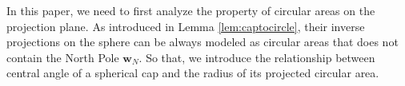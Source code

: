 \documentclass[final]{IEEEtran}
\newtheorem{corollary}{Corollary}
\begin{document}
\indent In this paper, we need to first analyze the property of circular areas on the projection plane. As introduced in Lemma \ref{lem:captocircle}, their inverse projections on the sphere can be always modeled as circular areas that does not contain the North Pole $\textbf{w}_N$. So that, we introduce the relationship between central angle of a spherical cap and the radius of its projected circular area.
\end{document}
